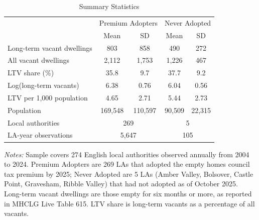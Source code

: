 \begin{table}[H]
\centering
\caption{Summary Statistics}
\begin{threeparttable}
\begin{tabular}{lcccc}
\toprule
 & \multicolumn{2}{c}{Premium Adopters} & \multicolumn{2}{c}{Never Adopted} \\
 & Mean & SD & Mean & SD \\
\midrule
Long-term vacant dwellings & 803 & 858 & 490 & 272 \\
All vacant dwellings & 2,112 & 1,753 & 1,226 & 467 \\
LTV share (\%) & 35.8 & 9.7 & 37.7 & 9.2 \\
Log(long-term vacants) & 6.38 & 0.76 & 6.04 & 0.56 \\
LTV per 1,000 population & 4.65 & 2.71 & 5.44 & 2.73 \\
Population & 169,548 & 110,597 & 90,509 & 22,315 \\
\midrule
Local authorities & \multicolumn{2}{c}{269} & \multicolumn{2}{c}{5} \\
LA-year observations & \multicolumn{2}{c}{5,647} & \multicolumn{2}{c}{105} \\
\bottomrule
\end{tabular}
\begin{tablenotes}[flushleft]
\small
\item \emph{Notes:} Sample covers 274 English local authorities observed annually from 2004 to 2024. Premium Adopters are 269 LAs that adopted the empty homes council tax premium by 2025; Never Adopted are 5 LAs (Amber Valley, Bolsover, Castle Point, Gravesham, Ribble Valley) that had not adopted as of October 2025. Long-term vacant dwellings are those empty for six months or more, as reported in MHCLG Live Table 615. LTV share is long-term vacants as a percentage of all vacants.
\end{tablenotes}
\end{threeparttable}
\label{tab:summary}
\end{table}

